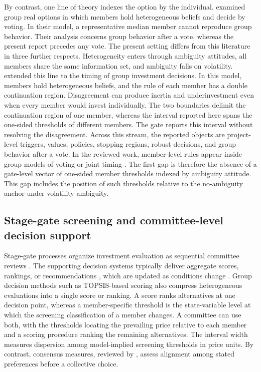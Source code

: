 By contrast, one line of theory indexes the option by the individual. \citet{Garlappi2017,Garlappi2022} examined group real options in which members hold heterogeneous beliefs and decide by voting. In their model, a representative median member cannot reproduce group behavior. Their analysis concerns group behavior after a vote, whereas the present report precedes any vote. The present setting differs from this literature in three further respects. Heterogeneity enters through ambiguity attitudes, all members share the same information set, and ambiguity falls on volatility. \citet{Cardenas2025} extended this line to the timing of group investment decisions. In this model, members hold heterogeneous beliefs, and the rule of each member has a double continuation region. Disagreement can produce inertia and underinvestment even when every member would invest individually. The two boundaries delimit the continuation region of one member, whereas the interval reported here spans the one-sided thresholds of different members. The gate reports this interval without resolving the disagreement. Across this stream, the reported objects are project-level triggers, values, policies, stopping regions, robust decisions, and group behavior after a vote. In the reviewed work, member-level rules appear inside group models of voting or joint timing \citep{Garlappi2017,Cardenas2025}. The first gap is therefore the absence of a gate-level vector of one-sided member thresholds indexed by ambiguity attitude. This gap includes the position of such thresholds relative to the no-ambiguity anchor under volatility ambiguity.

\subsection{Stage-gate screening and committee-level decision support}

Stage-gate processes organize investment evaluation as sequential committee reviews \citep{Cooper2008}. The supporting decision systems typically deliver aggregate scores, rankings, or recommendations \citep{Sprague1980,Power2002}, which are updated as conditions change \citep{Violos2025}. Group decision methods such as TOPSIS-based scoring \citep{HwangYoon1981} also compress heterogeneous evaluations into a single score or ranking. A score ranks alternatives at one decision point, whereas a member-specific threshold is the state-variable level at which the screening classification of a member changes. A committee can use both, with the thresholds locating the prevailing price relative to each member and a scoring procedure ranking the remaining alternatives. The interval width measures dispersion among model-implied screening thresholds in price units. By contrast, consensus measures, reviewed by \citet{HerreraViedma2014}, assess alignment among stated preferences before a collective choice.

